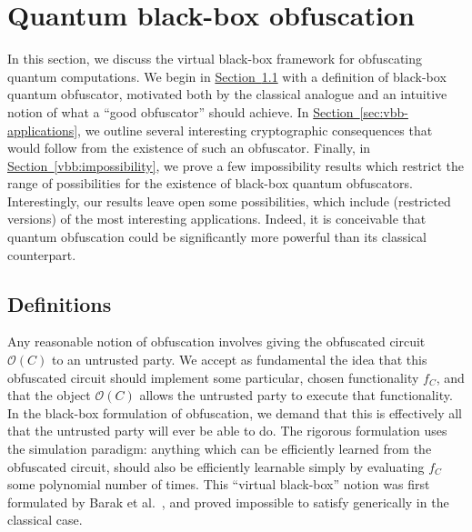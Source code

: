 \documentclass[envcountsame]{llncs}
\numberwithin{equation}{section}
\newcommand{\expref}[2]{\texorpdfstring{\hyperref[#2]{#1~\ref{#2}}}{#1~\ref{#2}}}
\newcommand{\algo}{\mathcal}
\begin{document}
%


\section{Quantum black-box obfuscation}\label{sec:black-box}

In this section, we discuss the virtual black-box framework for obfuscating quantum computations. We begin in \expref{Section}{sec:vbb-definitions} with a definition of black-box quantum obfuscator, motivated both by the classical analogue and an intuitive notion of what a ``good obfuscator'' should achieve. In \expref{Section}{sec:vbb-applications}, we outline several interesting cryptographic consequences that would follow from the existence of such an obfuscator. Finally, in \expref{Section}{vbb:impossibility}, we prove a few impossibility results which restrict the range of possibilities for the existence of black-box quantum obfuscators. Interestingly, our results leave open some possibilities, which include (restricted versions) of the most interesting applications. Indeed, it is conceivable that quantum obfuscation could be significantly more powerful than its classical counterpart.

\subsection{Definitions}\label{sec:vbb-definitions}

Any reasonable notion of obfuscation involves giving the obfuscated circuit $\algo O(C)$ to an untrusted party. We accept as fundamental the idea that this obfuscated circuit should implement some particular, chosen functionality $f_C$, and that the object $\algo O(C)$ allows the untrusted party to execute that functionality. In the black-box formulation of obfuscation, we demand that this is effectively all that the untrusted party will ever be able to do. The rigorous formulation uses the simulation paradigm: anything which can be efficiently learned from the obfuscated circuit, should also be efficiently learnable simply by evaluating $f_C$ some polynomial number of times. This ``virtual black-box'' notion was first formulated by Barak et al.~\cite{BGIRSVY12}, and proved impossible to satisfy generically in the classical case.
\end{document}
